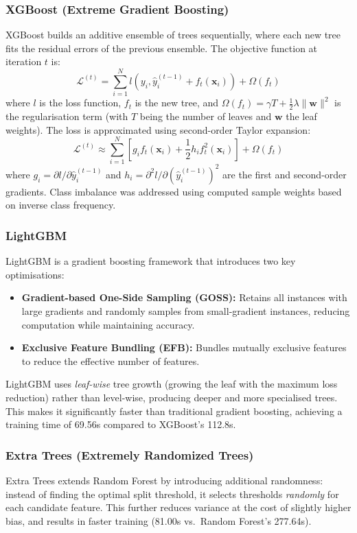 \documentclass[12pt, a4paper]{article}
\begin{document}
\subsubsection{XGBoost (Extreme Gradient Boosting)}
XGBoost builds an additive ensemble of trees sequentially, where each new tree fits the residual errors of the previous ensemble.
The objective function at iteration $t$ is:
\begin{equation}
    \mathcal{L}^{(t)} = \sum_{i=1}^{N} l(y_i, \hat{y}_i^{(t-1)} + f_t(\mathbf{x}_i)) + \Omega(f_t)
\end{equation}
where $l$ is the loss function, $f_t$ is the new tree, and $\Omega(f_t) = \gamma T + \frac{1}{2}\lambda \|\mathbf{w}\|^2$ is the regularisation term (with $T$ being the number of leaves and $\mathbf{w}$ the leaf weights).
The loss is approximated using second-order Taylor expansion:
\begin{equation}
    \mathcal{L}^{(t)} \approx \sum_{i=1}^{N} \left[ g_i f_t(\mathbf{x}_i) + \frac{1}{2} h_i f_t^2(\mathbf{x}_i) \right] + \Omega(f_t)
\end{equation}
where $g_i = \partial l / \partial \hat{y}_i^{(t-1)}$ and $h_i = \partial^2 l / \partial (\hat{y}_i^{(t-1)})^2$ are the first and second-order gradients.
Class imbalance was addressed using computed sample weights based on inverse class frequency.

\subsubsection{LightGBM}
LightGBM is a gradient boosting framework that introduces two key optimisations:
\begin{itemize}[nosep]
    \item \textbf{Gradient-based One-Side Sampling (GOSS):} Retains all instances with large gradients and randomly samples from small-gradient instances, reducing computation while maintaining accuracy.
    \item \textbf{Exclusive Feature Bundling (EFB):} Bundles mutually exclusive features to reduce the effective number of features.
\end{itemize}
LightGBM uses \textit{leaf-wise} tree growth (growing the leaf with the maximum loss reduction) rather than level-wise, producing deeper and more specialised trees.
This makes it significantly faster than traditional gradient boosting, achieving a training time of 69.56s compared to XGBoost's 112.8s.

\subsubsection{Extra Trees (Extremely Randomized Trees)}
Extra Trees extends Random Forest by introducing additional randomness: instead of finding the optimal split threshold, it selects thresholds \textit{randomly} for each candidate feature.
This further reduces variance at the cost of slightly higher bias, and results in faster training (81.00s vs.\ Random Forest's 277.64s).
\end{document}
